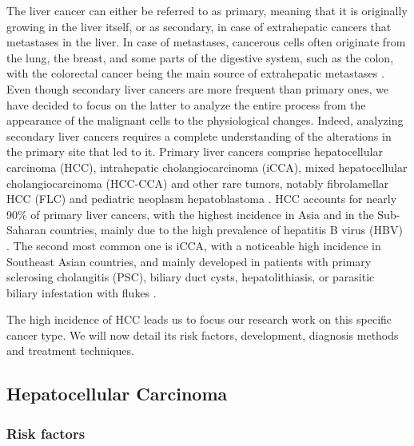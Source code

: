 \documentclass[]{article}
\begin{document}
The liver cancer can either be referred to as primary, meaning that it
is originally growing in the liver itself, or as secondary, in case of
extrahepatic cancers that metastases in the liver.
In case of metastases, cancerous cells often originate from the lung,
the breast, and some parts of the digestive system, such as the colon,
with the colorectal cancer being the main source of extrahepatic
metastases \cite{Hoyer2012a, Sahani2014}.
Even though secondary liver cancers are more frequent than primary ones,
we have decided to focus on the latter to analyze the entire process
from the appearance of the malignant cells to the physiological changes.
Indeed, analyzing secondary liver cancers requires a complete
understanding of the alterations in the primary site that led to it.
Primary liver cancers comprise hepatocellular carcinoma (HCC),
intrahepatic cholangiocarcinoma (iCCA), mixed hepatocellular
cholangiocarcinoma (HCC-CCA) and other rare tumors, notably
fibrolamellar HCC (FLC) and pediatric neoplasm hepatoblastoma
\cite{Sia2017, Lozano2012,20113051318}.
HCC accounts for nearly 90\% of primary liver cancers, with the highest
incidence in Asia and in the Sub-Saharan countries, mainly due to the
high prevalence of hepatitis B virus (HBV) \cite{Sia2017, Torre2015}. The second most common one is iCCA, with a
noticeable high incidence in Southeast Asian countries, and mainly
developed in patients with primary sclerosing cholangitis (PSC),
biliary duct cysts, hepatolithiasis, or parasitic biliary infestation
with flukes \cite{Sia2017, Bridgewater2014}.

The high incidence of HCC leads us to focus our research work on
this specific cancer type. We will now detail its risk factors,
development, diagnosis methods and treatment techniques.

\subsection*{Hepatocellular Carcinoma}\label{hepatocellular-carcinoma}

\subsubsection*{Risk factors}\label{risk-factors}
\end{document}
